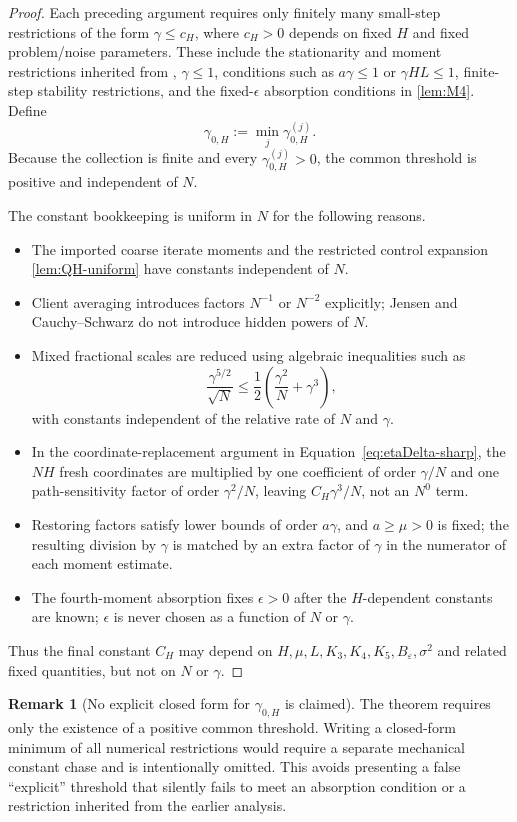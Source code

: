 \documentclass[11pt]{article}
\theoremstyle{definition}
\newtheorem{remark}[remark]{Remark}
\newcommand{\eps}{\varepsilon}
\begin{document}
\begin{proof}
Each preceding argument requires only finitely many small-step restrictions of the form $\gamma\le c_H$, where $c_H>0$ depends on fixed $H$ and fixed problem/noise parameters.
These include the stationarity and moment restrictions inherited from \citet{mangold2025scaffold}, $\gamma\le1$, conditions such as $a\gamma\le1$ or $\gamma HL\le1$, finite-step stability restrictions, and the fixed-$\epsilon$ absorption conditions in \cref{lem:M4}. Define
\[
  \gamma_{0,H}:=\min_j\gamma_{0,H}^{(j)}.
\]
Because the collection is finite and every $\gamma_{0, H}^{(j)}>0$, the common threshold is positive and independent of $N$.

The constant bookkeeping is uniform in $N$ for the following reasons.
\begin{itemize}
  \item The imported coarse iterate moments and the restricted control expansion \cref{lem:QH-uniform} have constants independent of $N$.
  \item Client averaging introduces factors $N^{-1}$ or $N^{-2}$ explicitly; Jensen and Cauchy--Schwarz do not introduce hidden powers of $N$.
  \item Mixed fractional scales are reduced using algebraic inequalities such as
  \[
    \frac{\gamma^{5/2}}{\sqrt N}
    \le \frac12\left(\frac{\gamma^2}{N}+\gamma^3\right),
  \]
  with constants independent of the relative rate of $N$ and $\gamma$.
  \item In the coordinate-replacement argument in Equation~\eqref{eq:etaDelta-sharp}, the $NH$ fresh coordinates are multiplied by one coefficient of order $\gamma/N$ and one path-sensitivity factor of order $\gamma^2/N$, leaving $C_H\gamma^3/N$, not an $N^0$ term.
  \item Restoring factors satisfy lower bounds of order $a\gamma$, and $a\ge\mu>0$ is fixed; the resulting division by $\gamma$ is matched by an extra factor of $\gamma$ in the numerator of each moment estimate.
  \item The fourth-moment absorption fixes $\epsilon>0$ after the $H$-dependent constants are known; $\epsilon$ is never chosen as a function of $N$ or $\gamma$.
\end{itemize}
Thus the final constant $C_H$ may depend on $H,\mu,L,K_3,K_4,K_5,B_\eps,\sigma^2$ and related fixed quantities, but not on $N$ or $\gamma$.
\end{proof}

\begin{remark}[No explicit closed form for $\gamma_{0,H}$ is claimed]
The theorem requires only the existence of a positive common threshold. Writing a closed-form minimum of all numerical restrictions would require a separate mechanical constant chase and is intentionally omitted. This avoids presenting a false ``explicit'' threshold that silently fails to meet an absorption condition or a restriction inherited from the earlier analysis.
\end{remark}
\end{document}
